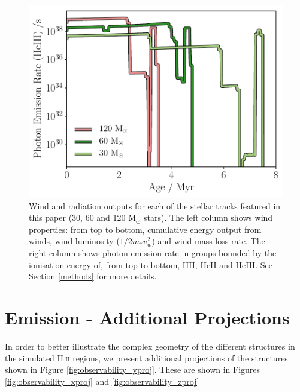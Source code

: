 \documentclass[a4paper,fleqn,usenatbib]{mnras}
\newcommand{\Msolar}{M$_{\odot}$\xspace}
\newcommand{\HII}{H$~$\textsc{ii}\xspace}
\begin{document}
\begin{figure}
	\includegraphics[width=1\columnwidth]{../plots/stellarevolution_photoHeIII.pdf}
	\caption{Wind and radiation outputs for each of the stellar tracks featured in this paper (30, 60 and 120 \Msolar stars). The left column shows wind properties: from top to bottom, cumulative energy output from winds, wind luminosity ($1/2 \dot{m}_* v_w^2$) and wind mass loss rate. The right column shows photon emission rate in groups bounded by the ionisation energy of, from top to bottom, HII, HeII and HeIII. See Section \ref{methods} for more details.}
	\label{fig:stellartracks}
\end{figure}

\section{Emission - Additional Projections}
\label{appendix:emission_additional_projections}

In order to better illustrate the complex geometry of the different structures in the simulated \HII regions, we present additional projections of the structures shown in Figure \ref{fig:observability_yproj}. These are shown in Figures \ref{fig:observability_xproj} and \ref{fig:observability_zproj}
\end{document}
